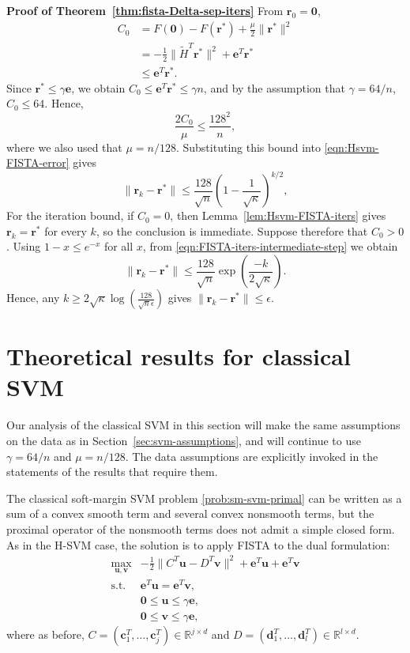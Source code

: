 \documentclass[twoside,11pt]{article}
\newcommand\bz{\bm{0}}
\renewcommand{\c}{\bm{c}}
\renewcommand{\d}{\bm{d}}
\newcommand{\R}{{\mathbb{R}}} %
\renewcommand\r{\bm{r}}
\renewcommand\u{\bm{u}}
\renewcommand\v{\bm{v}}
\newcommand\e{\bm{e}}
\newenvironment{proofof}[1]
  {\par\noindent\textbf{Proof of #1}\enspace\ignorespaces}
  {\hfill\BlackBox\\[2mm]}
\begin{document}
\begin{proofof}{Theorem~\ref{thm:fista-Delta-sep-iters}}
    From $\r_0 = \bz$,
    \begin{align*}
        C_0 &= F(\bz) - F(\r^*) + \frac{\mu}{2}\|\r^*\|^2\\
            &= -\frac{1}{2}\|\tilde{H}^T\r^*\|^2 + \e^T\r^*\\
            &\leq \e^T\r^*.
    \end{align*}
    Since $\r^* \leq \gamma\e$, we obtain $C_0 \leq \e^T\r^* \leq \gamma n$, and by the assumption that $\gamma = 64/n$, $C_0 \leq 64$. Hence,
    \[
        \frac{2C_0}{\mu} \leq \frac{128^2}{n},
    \]
    where we also used that $\mu = n/128$. Substituting this bound into \eqref{eqn:Hsvm-FISTA-error} gives
    \begin{equation} \label{eqn:FISTA-iters-intermediate-step}
        \|\r_k-\r^*\| \leq \frac{128}{\sqrt{n}}\left(1-\frac{1}{\sqrt{\kappa}}\right)^{k/2},
    \end{equation}
    For the iteration bound, if $C_0=0$, then Lemma~\ref{lem:Hsvm-FISTA-iters} gives $\r_k=\r^*$ for every $k$, so the conclusion is immediate. Suppose therefore that $C_0>0$. Using $1-x \leq e^{-x}$ for all $x$, from \eqref{eqn:FISTA-iters-intermediate-step} we obtain 
    \[
        \|\r_k - \r^*\| \leq \frac{128}{\sqrt{n}}\exp\left(\frac{-k}{2\sqrt{\kappa}}\right).
    \]
    Hence, any $k \geq 2\sqrt{\kappa}\log\left(\frac{128}{\sqrt{n}\epsilon}\right)$ gives $\|\r_k - \r^*\| \leq \epsilon$.
\end{proofof}


\section{Theoretical results for classical SVM} \label{app:svm-analysis}
Our analysis of the classical SVM in this section will make the same assumptions on the data as in Section~\ref{sec:svm-assumptions}, and will continue to use $\gamma = 64/n$ and $\mu = n/128$. The data assumptions are explicitly invoked in the statements of the results that require them.

The classical soft-margin SVM problem \eqref{prob:sm-svm-primal} can be written as a sum of a convex smooth term and several convex nonsmooth terms, but the proximal operator of the nonsmooth terms does not admit a simple closed form. As in the H-SVM case, the solution is to apply FISTA to the dual formulation:
\begin{equation} \label{prob:sm-svm-dual}
  \begin{array}{rll}
    \max_{\u,\v} & -\frac{1}{2}\|C^T\u - D^T\v\|^2 + \e^T\u+\e^T\v \\
    \mbox{s.t.} & \e^T\u=\e^T\v, \\
    & \bz\le\u\le\gamma\e,\\
    & \bz\le\v\le\gamma\e,
  \end{array}
\end{equation}
where as before, $C = (\c_1^T,\hdots,\c_j^T) \in \R^{j\times d}$ and $D = (\d_1^T,\hdots,\d_l^T) \in \R^{l \times d}$.
\end{document}
